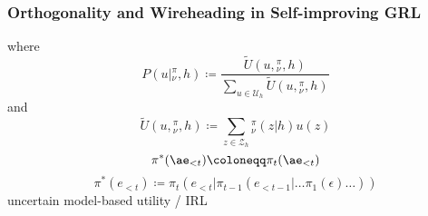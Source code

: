 \documentclass[UTF8,11pt,colorlinks,compress,openany]{beamer}%
\begin{document}
\begin{frame}\frametitle{Orthogonality and Wireheading in Self-improving GRL}
\begin{block}{}
\end{block}
where
\[P(u|{}_\nu^\pi,h)\coloneqq \frac{\tilde{U}(u,{}_\nu^\pi,h)}{\sum\limits_{u\in\mathcal{U}_h}\tilde{U}(u,{}_\nu^\pi,h)}\]
and
\[\tilde{U}(u,{}_\nu^\pi,h)\coloneqq \sum\limits_{z\in\mathcal{Z}_h}{}_\nu^\pi(z|h)u(z)\]
\[\pi^*(\ae_{<t})\coloneqq \pi_t(\ae_{<t})\]
\[
\pi^*(e_{<t})\coloneqq \pi_t(e_{<t}|\pi_{t-1}(e_{<t-1}|\ldots \pi_1(\epsilon)\ldots))\tag{Perfect Bayes-Nash}
\]
\centering uncertain model-based utility / IRL
\end{frame}
\end{document}
